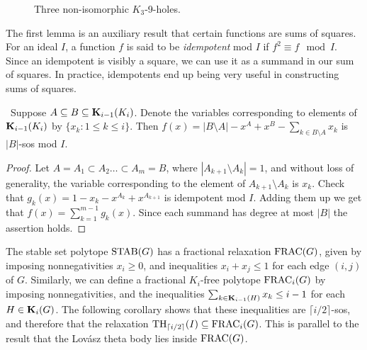 \begin{figure}[htd]
	\caption{Three non-isomorphic $K_3$-9-holes.}
	\label{9holeintro}
\end{figure}

The first lemma is an auxiliary result that certain functions are sums of squares. For an ideal $I$, a function $f$ is said to be {\em idempotent} mod $I$ if $f^2 \equiv f \mod I$. Since an idempotent is visibly a square, we can use it as a summand in our sum of squares. In practice, idempotents end up being very useful in constructing sums of squares.

\begin{lemma}\label{ki}\
Suppose 
$A \subseteq B \subseteq \mathbf{K}_{i-1}(K_i)$. Denote the variables corresponding to elements of $\mathbf{K}_{i-1}(K_i)$ by $\{x_k:1 \le k \le i\}$.
Then $f(x) = |B \setminus A| - x^A+x^B- \sum_{k\in B\setminus A} x_k $ is $|B|$-sos mod $I$.
\end{lemma}
\begin{proof}
Let $A = A_1 \subset A_2 \ldots \subset A_m = B$, where $|A_{k+1} \setminus A_k|
= 1$, and without loss of generality, the variable corresponding to the element of $A_{k+1} \setminus A_k$ is $x_k$. Check that $g_k(x) = 1-x_k-x^{A_k} + x^{A_{k+1}}$ is idempotent mod $I$. Adding them
up we get that $f(x) = \sum_{k=1}^{m-1} g_k(x)$. Since each summand has degree at most $|B|$ the assertion holds.
\end{proof}

The stable set polytope $\textup{STAB}(G)$ has a fractional relaxation $\textup{FRAC}(G)$, given by imposing nonnegativities $x_i \ge 0$, and inequalities $x_i + x_j \le 1$ for each edge $(i,j)$ of $G$. Similarly, we can define a fractional $K_i$-free polytope $\textup{FRAC}_i(G)$ by imposing nonnegativities, and the inequalities $\sum_{k \in \mathbf{K}_{i-1}(H)}x_k \le i-1$ for each $H \in \mathbf{K}_i(G)$. The following corollary shows that these inequalities are $\lceil i/2 \rceil$-sos, and therefore that the relaxation $\textup{TH}_{\lceil i/2 \rceil}(I) \subseteq \textup{FRAC}_i(G)$. This is parallel to the result that the Lov\'{a}sz theta body lies inside $\textup{FRAC}(G)$.

